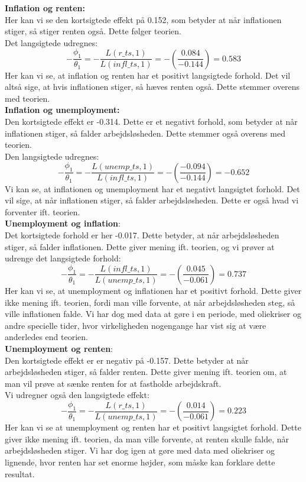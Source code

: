 \documentclass[
  10pt,
]{article}
\begin{document}
\textbf{Inflation og renten:}\\
Her kan vi se den kortsigtede effekt på 0.152, som betyder at når
inflationen stiger, så stiger renten også. Dette følger teorien.\\
Det langsigtede udregnes:
\[-\frac{\phi_1}{\theta_1} = -\frac{L(r\_ts,1)}{L(infl\_ts,1)} = -\left(\frac{0.084}{-0.144}\right)=0.583 \]
Her kan vi se, at inflation og renten har et positivt langsigtede
forhold. Det vil altså sige, at hvis inflationen stiger, så hæves renten
også. Dette stemmer overens med teorien.\\

\textbf{Inflation og unemployment:}\\
Den kortsigtede effekt er -0.314. Dette er et negativt forhold, som
betyder at når inflationen stiger, så falder arbejdsløsheden. Dette
stemmer også overens med teorien.\\
Den langsigtede udregnes:
\[-\frac{\phi_1}{\theta_1} = -\frac{L(unemp\_ts,1)}{L(infl\_ts,1)} = -\left( \frac{-0.094}{-0.144}\right)=-0.652 \]
Vi kan se, at inflationen og unemployment har et negativt langsigtet
forhold. Det vil sige, at når inflationen stiger, så falder
arbejdsløsheden. Dette er også hvad vi forventer ift. teorien.\\

\textbf{Unemployment og inflation}:\\
Det kortsigtede forhold er her -0.017. Dette betyder, at når
arbejdsløsheden stiger, så falder inflationen. Dette giver mening ift.
teorien, og vi prøver at udrenge det langsigtede forhold:
\[-\frac{\phi_1}{\theta_1} = -\frac{L(infl\_ts,1)}{L(unemp\_ts,1)} = -\left( \frac{0.045}{-0.061}\right)=0.737 \]
Her kan vi se, at unemployment og inflationen har et positivt forhold.
Dette giver ikke mening ift. teorien, fordi man ville forvente, at når
arbejdsløsheden steg, så ville inflationen falde. Vi har dog med data at
gøre i en periode, med oliekriser og andre specielle tider, hvor
virkeligheden nogengange har vist sig at være anderledes end teorien.\\

\textbf{Unemployment og renten}:\\
Den kortsigtede effekt er er negativ på -0.157. Dette betyder at når
arbejdsløsheden stiger, så falder renten. Dette giver mening ift.
teorien om, at man vil prøve at sænke renten for at fastholde
arbejdskraft.\\
Vi udregner også den langsigtede effekt:
\[-\frac{\phi_1}{\theta_1} = -\frac{L(r\_ts,1)}{L(unemp\_ts,1)} = -\left( \frac{0.014}{-0.061}\right)=0.223 \]
Her kan vi se at unemployment og renten har et positivt langsigtet
forhold. Dette giver ikke mening ift. teorien, da man ville forvente, at
renten skulle falde, når arbejdsløsheden stiger. Vi har dog igen at gøre
med data med oliekriser og lignende, hvor renten har set enorme højder,
som måske kan forklare dette resultat.\\
\end{document}
